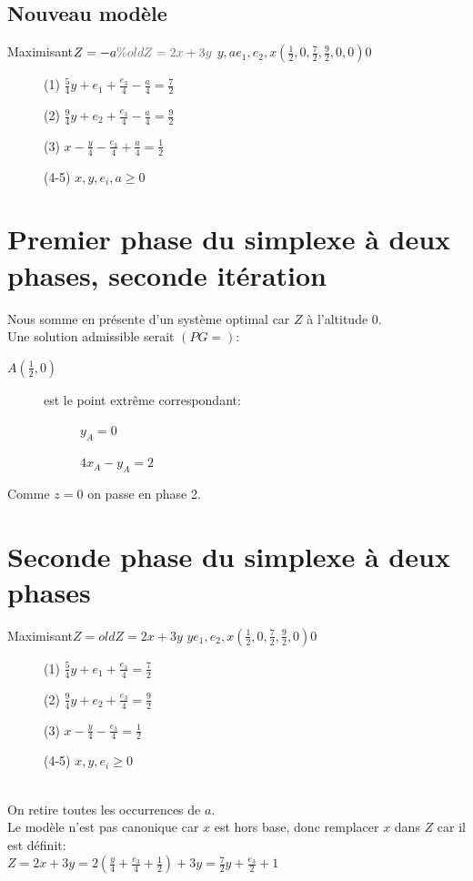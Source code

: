 \subsection{Nouveau modèle}
        {Maximisant}{$Z = -a \\ \cgris{\% oldZ = 2x + 3y}$}
        {$y,a$}{$e_1,e_2,x$}{$(\frac{1}{2},0,\frac{7}{2}, \frac{9}{2}, 0,0)$}{$0$}
        {\begin{description}
\item[] (1) $\frac{5}{4}y + e_1 + \frac{e_3}{4} - \frac{a}{4} = \frac{7}{2}$
\item[] (2) $\frac{9}{4}y + e_2 + \frac{e_3}{4} - \frac{a}{4} = \frac{9}{2}$
\item[] (3) $x - \frac{y}{4} - \frac{e_3}{4} + \frac{a}{4} = \frac{1}{2}$
\item[] (4-5) $x,y,e_i,a \geqslant 0$
\end{description}
}

\section{Premier phase du simplexe à deux phases, seconde itération}
Nous somme en présente d'un système optimal car $Z$ à l'altitude 0.\\
Une solution admissible serait $(PG=)$:
\begin{description}
\item[$A(\frac{1}{2},0)$] est le point extrême correspondant:
\item[] \begin{description}
\item[] $y_A = 0$
\item[] $4x_A - y_A = 2$
\end{description}
\end{description}

Comme $z = 0$ on passe en phase 2.
\section{Seconde phase du simplexe à deux phases}
        {Maximisant}{$Z = oldZ = 2x + 3y$}
        {$y$}{$e_1,e_2,x$}{$(\frac{1}{2},0,\frac{7}{2}, \frac{9}{2}, 0)$}{$0$}
        {\begin{description}
\item[] (1) $\frac{5}{4}y + e_1 + \frac{e_3}{4} = \frac{7}{2}$
\item[] (2) $\frac{9}{4}y + e_2 + \frac{e_3}{4} = \frac{9}{2}$
\item[] (3) $x - \frac{y}{4} - \frac{e_3}{4} = \frac{1}{2}$
\item[] (4-5) $x,y,e_i \geqslant 0$
\end{description}
}\ \\
On retire toutes les occurrences de $a$.\\
Le modèle n'est pas canonique car $x$ est hors base, donc remplacer $x$ dans $Z$ car il est définit:\\
$Z = 2x + 3y = 2(\frac{y}{4} + \frac{e_3}{4} + \frac{1}{2}) + 3y = \frac{7}{2}y + \frac{e_3}{2} + 1$\\

